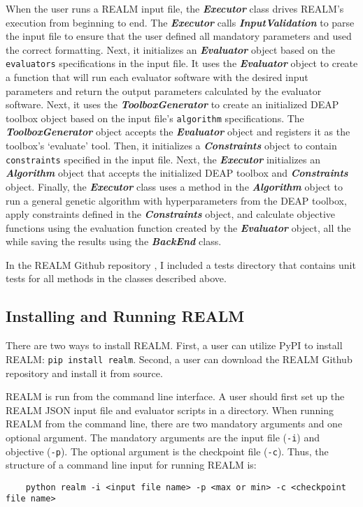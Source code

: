 When the user runs a REALM input file, the \textbf{\textit{Executor}} class 
drives REALM's execution from beginning to end.
The \textbf{\textit{Executor}} calls \textbf{\textit{InputValidation}} to 
parse the input file to ensure that the user defined all mandatory parameters
and used the correct formatting.
Next, it initializes an \textbf{\textit{Evaluator}} object based on the 
\texttt{evaluators} specifications in the input file. 
It uses the \textbf{\textit{Evaluator}} object to create a function that will 
run each evaluator software with the desired input parameters and return the 
output parameters calculated by the evaluator software. 
Next, it uses the \textbf{\textit{ToolboxGenerator}} to create an initialized 
DEAP toolbox object based on the input file's \texttt{algorithm} specifications. 
The \textbf{\textit{ToolboxGenerator}} object accepts the 
\textbf{\textit{Evaluator}} object and registers it as the toolbox's `evaluate' 
tool.  
Then, it initializes a \textbf{\textit{Constraints}} object to contain 
\texttt{constraints} specified in the input file. 
Next, the \textbf{\textit{Executor}} initializes an \textbf{\textit{Algorithm}} 
object that accepts the initialized DEAP toolbox and \textbf{\textit{Constraints}} 
object. 
Finally, the \textbf{\textit{Executor}} class uses a method in the 
\textbf{\textit{Algorithm}} object to run a general genetic algorithm with 
hyperparameters from the DEAP toolbox, apply constraints defined in the 
\textbf{\textit{Constraints}} object, and calculate objective functions using 
the evaluation function created by the \textbf{\textit{Evaluator}} object, all 
the while saving the results using the \textbf{\textit{BackEnd}} class. 

In the REALM Github repository \cite{chee_arfcrealm_2021}, I included a tests 
directory that contains unit tests for all methods in the classes described 
above. 

\subsection{Installing and Running REALM}
There are two ways to install REALM.
First, a user can utilize \gls{PyPI} to install REALM: \texttt{pip install realm}.
Second, a user can download the REALM Github repository \cite{chee_arfcrealm_2021}
and install it from source. 

REALM is run from the command line interface. 
A user should first set up the REALM JSON input file and evaluator 
scripts in a directory. 
When running REALM from the command line, there are two mandatory arguments and 
one optional argument. 
The mandatory arguments are the input file (\texttt{-i}) and objective (\texttt{-p}). 
The optional argument is the checkpoint file (\texttt{-c}).  
Thus, the structure of a command line input for running REALM is: 
\begin{verbatim}
    python realm -i <input file name> -p <max or min> -c <checkpoint file name>
\end{verbatim} 


